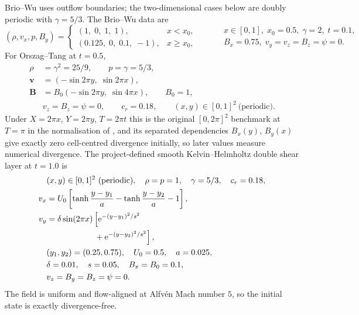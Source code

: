Brio--Wu \citep{brio_wu_1988} uses outflow boundaries; the two-dimensional cases
below are doubly periodic with $\gamma=5/3$. The Brio--Wu data are
\begin{equation}
 (\rho,v_x,p,B_y)=
 \begin{cases}
  (1,\;0,\;1,\;1), & x<x_0,\\
  (0.125,\;0,\;0.1,\;-1), & x\ge x_0,
 \end{cases}
 \qquad
 \begin{aligned}
  &x\in[0,1],\; x_0=0.5,\; \gamma=2,\; t=0.1,\\
  &B_x=0.75,\; v_y=v_z=B_z=\psi=0 .
 \end{aligned}
 \label{eq:ch3-ic-briowu}
\end{equation}
For Orszag--Tang at $t=0.5$,
\begin{equation}
 \begin{aligned}
  \rho &= \gamma^{2}=25/9,\qquad p=\gamma=5/3,\\
  \mathbf v &= (-\sin 2\pi y,\;\sin 2\pi x),\\
  \mathbf B &= B_0(-\sin 2\pi y,\;\sin 4\pi x),\qquad B_0=1,\\
  &v_z=B_z=\psi=0,\qquad c_r=0.18,\qquad
  (x,y)\in[0,1]^2\ \text{(periodic)} .
 \end{aligned}
 \label{eq:ch3-ic-ot}
\end{equation}
Under $X=2\pi x$, $Y=2\pi y$, $T=2\pi t$ this is the original $[0,2\pi]^2$
benchmark at $T=\pi$ \citep{orszagTang1979} in the normalisation of
\citet{toth_2000}, and its separated dependencies $B_x(y)$, $B_y(x)$ give
exactly zero cell-centred divergence initially, so later values measure
numerical divergence. The project-defined smooth Kelvin--Helmholtz double shear
layer at $t=1.0$ is
\begin{align}
 &(x,y)\in[0,1]^2\ \text{(periodic)},\quad
 \rho=p=1,\quad \gamma=5/3,\quad c_r=0.18, \notag\\
 v_x &= U_0\left[\tanh\frac{y-y_1}{a}-\tanh\frac{y-y_2}{a}-1\right], \notag\\
 v_y &= \delta\sin(2\pi x)\left[\mathrm{e}^{-(y-y_1)^2/s^2}\right. \notag\\
     &\hspace{5.6em}\left.{}+\mathrm{e}^{-(y-y_2)^2/s^2}\right], \notag\\
 &(y_1,y_2)=(0.25,0.75),\quad U_0=0.5,\quad a=0.025, \notag\\
 &\delta=0.01,\quad s=0.05,\quad B_x=B_0=0.1, \notag\\
 &v_z=B_y=B_z=\psi=0 .
 \label{eq:ch3-ic-kh}
\end{align}
The field is uniform and flow-aligned at Alfv\'en Mach number $5$, so the
initial state is exactly divergence-free.

